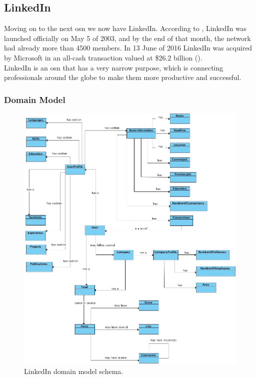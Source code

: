 \subsection{LinkedIn}

Moving on to the next \gls{osn} we now have LinkedIn. According to \cite{linkabout}, LinkedIn was launched officially on May 5 of 2003, and by the end of
that month, the network had already more than 4500 members. In 13 June of 2016 LinkedIn was acquired by Microsoft in an all-cash transaction valued at \$26.2
billion (\cite{microlink}).\\
\indent LinkedIn is an \gls{osn} that has a very narrow purpose, which is
connecting professionals around the globe to make them more productive and successful.

\subsubsection*{Domain Model}

\begin{figure}[h!]
  \hspace*{-0.5in}
  \includegraphics[width=1.10\textwidth]{img/linkedin-domain-model.jpg}
\caption{\label{img:linkdomain} LinkedIn domain model schema.}
\end{figure}

